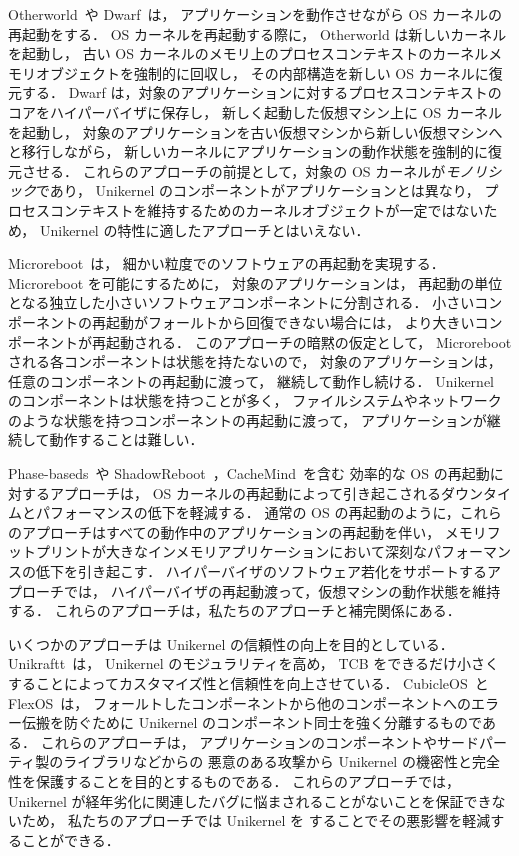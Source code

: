 Otherworld~\cite{DepoutovitchEtAl-otherworld}や Dwarf~\cite{TeradaEtAl-Dwarf}は，
アプリケーションを動作させながら OS カーネルの再起動をする．
OS カーネルを再起動する際に，
Otherworld は新しいカーネルを起動し，
古い OS カーネルのメモリ上のプロセスコンテキストのカーネルメモリオブジェクトを強制的に回収し，
その内部構造を新しい OS カーネルに復元する．
Dwarf は，対象のアプリケーションに対するプロセスコンテキストのコアをハイパーバイザに保存し，
新しく起動した仮想マシン上に OS カーネルを起動し，
対象のアプリケーションを古い仮想マシンから新しい仮想マシンへと移行しながら，
新しいカーネルにアプリケーションの動作状態を強制的に復元させる．
これらのアプローチの前提として，対象の OS カーネルが\emph{モノリシック}であり，
Unikernel のコンポーネントがアプリケーションとは異なり，
プロセスコンテキストを維持するためのカーネルオブジェクトが一定ではないため，
Unikernel の特性に適したアプローチとはいえない．


Microreboot~\cite{CandeaEtAl-Microreboot}は，
細かい粒度でのソフトウェアの再起動を実現する．
Microreboot を可能にするために，
対象のアプリケーションは，
再起動の単位となる独立した小さいソフトウェアコンポーネントに分割される．
小さいコンポーネントの再起動がフォールトから回復できない場合には，
より大きいコンポーネントが再起動される．
このアプローチの暗黙の仮定として，
Microreboot される各コンポーネントは状態を持たないので，
対象のアプリケーションは，任意のコンポーネントの再起動に渡って，
継続して動作し続ける．
Unikernel のコンポーネントは状態を持つことが多く，
ファイルシステムやネットワークのような状態を持つコンポーネントの再起動に渡って，
アプリケーションが継続して動作することは難しい．

Phase-baseds~\cite{YamakitaEtAl-PBR}や ShadowReboot~\cite{YamadaEtAl-ShadowR}，CacheMind~\cite{KouraiEtAl-cachemind}を含む
効率的な OS の再起動に対するアプローチは，
OS カーネルの再起動によって引き起こされるダウンタイムとパフォーマンスの低下を軽減する．
通常の OS の再起動のように，これらのアプローチはすべての動作中のアプリケーションの再起動を伴い，
メモリフットプリントが大きなインメモリアプリケーションにおいて深刻なパフォーマンスの低下を引き起こす．
ハイパーバイザのソフトウェア若化をサポートするアプローチでは，
ハイパーバイザの再起動渡って，仮想マシンの動作状態を維持する．
これらのアプローチは，私たちのアプローチと補完関係にある．

いくつかのアプローチは Unikernel の信頼性の向上を目的としている．
Unikraftt~\cite{KuenzerEtAl-Unikraft}は，
Unikernel のモジュラリティを高め，
TCB をできるだけ小さくすることによってカスタマイズ性と信頼性を向上させている．
CubicleOS~\cite{SartakovEtAl-ASPLOS21}と FlexOS~\cite{LefeuvreEtAl-FlexOS}は，
フォールトしたコンポーネントから他のコンポーネントへのエラー伝搬を防ぐために
Unikernel のコンポーネント同士を強く分離するものである．
これらのアプローチは，
アプリケーションのコンポーネントやサードパーティ製のライブラリなどからの
悪意のある攻撃から Unikernel の機密性と完全性を保護することを目的とするものである．
これらのアプローチでは，Unikernel が経年劣化に関連したバグに悩まされることがないことを保証できないため，
私たちのアプローチでは Unikernel を \rr することでその悪影響を軽減することができる．


